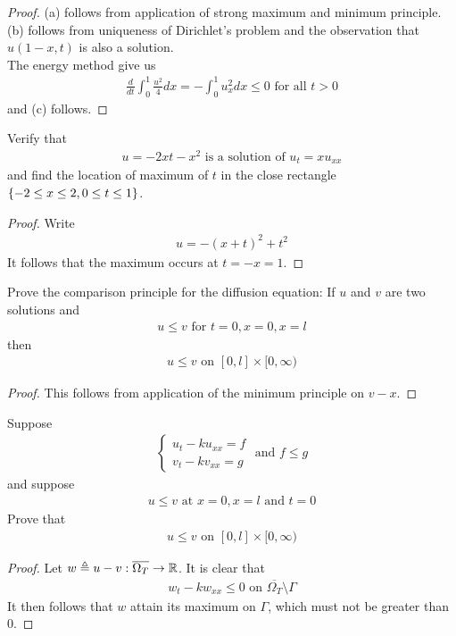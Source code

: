 \documentclass{report}
\begin{document}
\begin{proof}
  (a) follows from application of strong maximum and minimum principle. (b) follows from uniqueness of Dirichlet's problem and the observation that $u(1-x,t)$ is also a solution. \\

The energy method give us 
\begin{align*}
\frac{d}{dt}\int_0^1 \frac{u^2}{4}dx = - \int_0^1 u_x^2dx \leq 0\text{ for all }t>0
\end{align*}
and (c) follows.
\end{proof}
\begin{question}{}{}
Verify that 
\begin{align*}
u=-2xt-x^2\text{ is a solution of }u_t=xu_{xx}
\end{align*}
and find the location of maximum of $t$ in the close rectangle $\{ -2\leq x\leq 2,0\leq t\leq 1 \}$. 
\end{question}
\begin{proof}
Write 
\begin{align*}
u=-(x+t)^2+t^2
\end{align*}
It follows that the maximum occurs at $t=-x=1$. 
\end{proof}
\begin{question}{}{}
Prove the comparison principle for the diffusion equation: If $u$ and  $v$ are two solutions and 
 \begin{align*}
u\leq v\text{ for }t=0,x=0,x=l
\end{align*}
then 
\begin{align*}
u\leq v\text{ on }[0,l]\times [0,\infty)
\end{align*}
\end{question}
\begin{proof}
This follows from application of the minimum principle on $v-x$. 
\end{proof}
\begin{question}{}{}
Suppose 
\begin{align*}
\begin{cases}
u_t-ku_{xx}=f\\
v_t-kv_{xx}=g
\end{cases}\text{ and }f\leq g
\end{align*}
and suppose 
\begin{align*}
u\leq v\text{ at }x=0,x=l\text{ and }t=0
\end{align*}
Prove that 
\begin{align*}
u\leq v\text{ on }[0,l]\times[0,\infty)
\end{align*}
\end{question}
\begin{proof}
Let $w\triangleq u-v:\overline{\Omega_T}\rightarrow \mathbb{R}$. It is clear that 
\begin{align*}
w_t-kw_{xx}\leq 0\text{ on }\overline{\Omega_T}\setminus \Gamma 
\end{align*}
It then follows that $w$ attain its maximum on $\Gamma $, which must not be greater than $0$. 
\end{proof}
\end{document}

